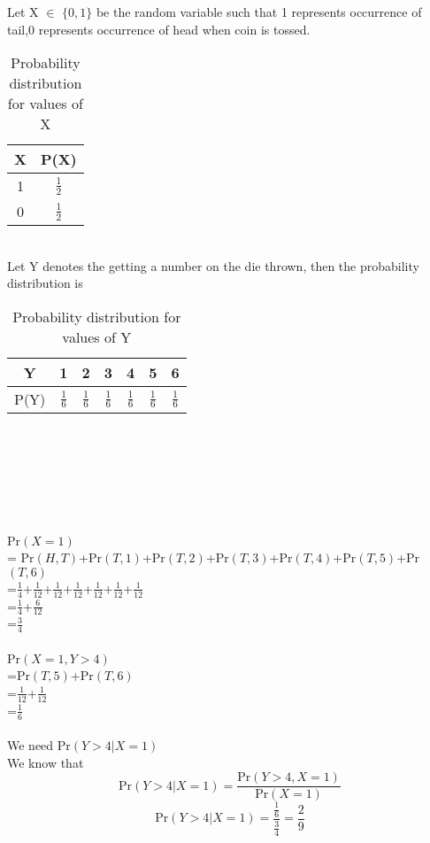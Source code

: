 \documentclass[journal,12pt,twocolumn]{IEEEtran}
\begin{document}
Let X $\in$ $\{0,1\}$ be the random variable such that 1 represents occurrence of tail,0 represents occurrence of head when coin is tossed.
\begin{table}[ht]
\caption{Probability distribution for values of X}
\begin{center}
    \begin{tabular}{|c|c|}
    \hline
    X & P(X)\\
    \hline
    1 & $\frac{1}{2}$ \\
    \hline
    0 & $\frac{1}{2}$\\
    \hline
    \end{tabular}
\end{center} 
\end{table}
\\Let Y denotes the getting a number on the die thrown, then the probability distribution is
\begin{table}[ht]
\caption{Probability distribution for values of Y}
\begin{center}
    \begin{tabular}{|c|c|c|c|c|c|c|}
    \hline
    Y & 1 & 2 & 3 & 4 & 5 & 6 \\
    \hline
    P(Y) & $\frac{1}{6}$ & $\frac{1}{6}$ & $\frac{1}{6}$ & $\frac{1}{6}$ & $\frac{1}{6}$ & $\frac{1}{6}$  \\
    \hline
    \end{tabular}
\end{center} 
\end{table}
\\\\\\\\\\\\
Pr$(X=1)$\\
= Pr$(H,T)$+Pr$(T,1)$+Pr$(T,2)$+Pr$(T,3)$+Pr$(T,4)$+Pr$(T,5)$+Pr$(T,6)$ \\ 
=$\frac{1}{4}$+$\frac{1}{12}$+$\frac{1}{12}$+$\frac{1}{12}$+$\frac{1}{12}$+$\frac{1}{12}$+$\frac{1}{12}$\\
=$\frac{1}{4}$+$\frac{6}{12}$\\
=$\frac{3}{4}$\\\\
Pr$(X=1,Y>4)$\\
=Pr$(T,5)$+Pr$(T,6)$\\
=$\frac{1}{12}$+$\frac{1}{12}$\\
=$\frac{1}{6}$\\\\
We need Pr$(Y>4|X=1)$\\
We know that
\begin{equation}
   \text{Pr}(Y>4|X=1)= \frac{\text{Pr}(Y>4,X=1)}{\text{Pr}(X=1)} 
\end{equation}
\begin{equation}
  \text{Pr}(Y>4|X=1)= \frac{\frac{1}{6}}{\frac{3}{4}}=\frac{2}{9}
\end{equation}
\therefore {} \\\\
\begin{lstlisting}

\end{lstlisting}
\end{document}

